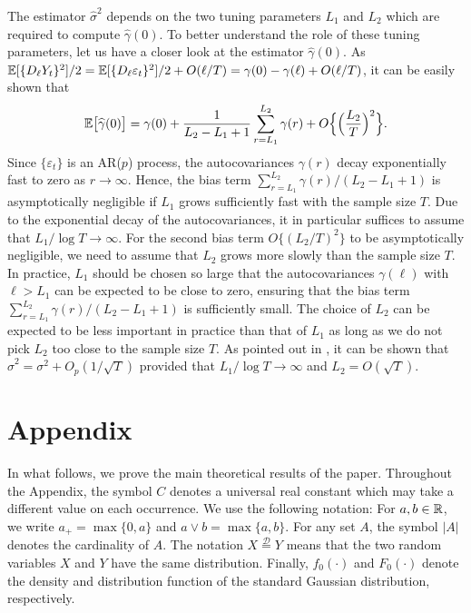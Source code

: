 \documentclass[a4paper,12pt]{article}
\numberwithin{equation}{section}
\begin{document}
The estimator $\widehat{\sigma}^2$ depends on the two tuning parameters $L_1$ and $L_2$ which are required to compute $\widehat{\gamma}(0)$. To better understand the role of these tuning parameters, let us have a closer look at the estimator $\widehat{\gamma}(0)$. As $\mathbb{E}[ \{ D_\ell Y_t \}^2 ]/2 = \mathbb{E}[ \{ D_\ell \varepsilon_t \}^2 ]/2 + O(\ell/T) = \gamma(0) - \gamma(\ell) + O(\ell/T)$, it can be easily shown that
\[ \mathbb{E}\big[\widehat{\gamma}(0)\big] = \gamma(0) + \frac{1}{L_2-L_1+1}\sum_{r=L_1}^{L_2} \gamma(r) + O\Big\{ \Big(\frac{L_2}{T} \Big)^2 \Big\}. \]
Since $\{ \varepsilon_t\}$ is an AR($p$) process, the autocovariances $\gamma(r)$ decay exponentially fast to zero as $r \rightarrow \infty$. Hence, the bias term $\sum_{r=L_1}^{L_2} \gamma(r) / (L_2-L_1+1)$ is asymptotically negligible if $L_1$ grows sufficiently fast with the sample size $T$. Due to the exponential decay of the autocovariances, it in particular suffices to assume that $L_1/\log T \rightarrow \infty$. For the second bias term  $O\{ (L_2/T)^2 \}$ to be asymptotically negligible, we need to assume that $L_2$ grows more slowly than the sample size $T$. In practice, $L_1$ should be chosen so large that the autocovariances $\gamma(\ell)$ with $\ell > L_1$ can be expected to be close to zero, ensuring that the bias term $\sum_{r=L_1}^{L_2} \gamma(r) / (L_2-L_1+1)$ is sufficiently small. The choice of $L_2$ can be expected to be less important in practice than that of $L_1$ as long as we do not pick $L_2$ too close to the sample size $T$. As pointed out in \cite{Hall2003}, it can be shown that $\widehat{\sigma}^2 = \sigma^2 + O_p(1/\sqrt{T})$ provided that $L_1/\log T \rightarrow \infty$ and $L_2 = O(\sqrt{T})$. 




\newpage
\section*{Appendix}

\def\theequation{A.\arabic{equation}}
\setcounter{equation}{0}
\allowdisplaybreaks[3]



In what follows, we prove the main theoretical results of the paper. Throughout the Appendix, the symbol $C$ denotes a universal real constant which may take a different value on each occurrence. We use the following notation: For $a,b \in \mathbb{R}$, we write $a_+ = \max \{0,a\}$ and $a \vee b = \max\{a,b\}$. For any set $A$, the symbol $|A|$ denotes the cardinality of $A$. The notation $X \stackrel{\mathcal{D}}{=} Y$ means that the two random variables $X$ and $Y$ have the same distribution. Finally, $f_0(\cdot)$ and $F_0(\cdot)$ denote the density and distribution function of the standard Gaussian distribution, respectively.
\end{document}
